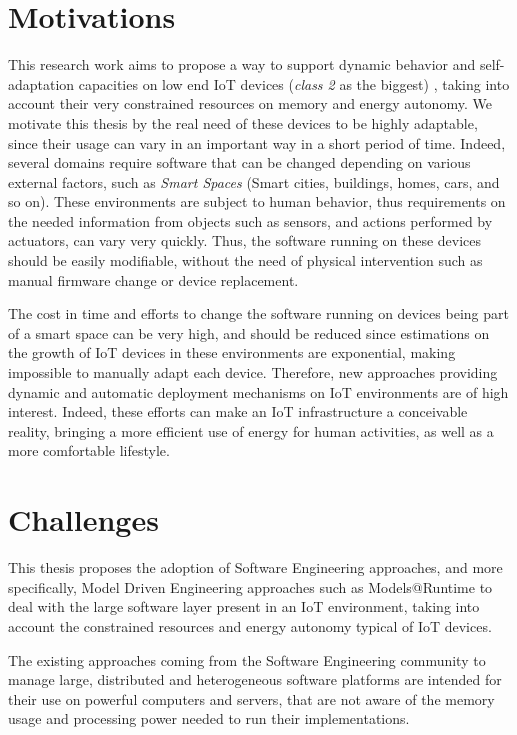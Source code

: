 \section{Motivations}
This research work aims to propose a way to support dynamic behavior and self-adaptation capacities on low end IoT devices (\textit{class 2}\cite{rfc7228} as the biggest) , taking into account their very constrained resources on memory and energy autonomy.
We motivate this thesis by the real need of these devices to be highly adaptable, since their usage can vary in an important way in a short period of time.
Indeed, several domains require software that can be changed depending on various external factors, such as \textit{Smart Spaces} (Smart cities, buildings, homes, cars, and so on).
These environments are subject to human behavior, thus requirements on the needed information from objects such as sensors, and actions performed by actuators, can vary very quickly.
Thus, the software running on these devices should be easily modifiable, without the need of physical intervention such as manual firmware change or device replacement.

The cost in time and efforts to change the software running on devices being part of a smart space can be very high, and should be reduced since estimations on the growth of IoT devices in these environments are exponential, making impossible to manually adapt each device.
Therefore, new approaches providing dynamic and automatic deployment mechanisms on IoT environments are of high interest.
Indeed, these efforts can make an IoT infrastructure a conceivable reality, bringing a more efficient use of energy for human activities, as well as a more comfortable lifestyle.

\section{Challenges}
This thesis proposes the adoption of Software Engineering approaches, and more specifically, Model Driven Engineering approaches such as Models@Runtime\cite{morin2010leveraging} to deal with the large software layer present in an IoT environment, taking into account the constrained resources and energy autonomy typical of IoT devices.

The existing approaches coming from the Software Engineering community to manage large, distributed and heterogeneous software platforms are intended for their use on powerful computers and servers, that are not aware of the memory usage and processing power needed to run their implementations.

